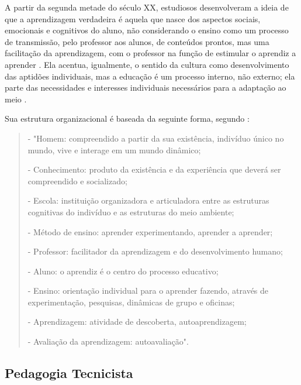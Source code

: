 A partir da segunda metade do século XX, estudiosos desenvolveram a ideia de que a aprendizagem verdadeira é aquela que nasce dos aspectos sociais, emocionais e cognitivos do aluno, não considerando o ensino como um processo de transmissão, pelo professor aos alunos, de conteúdos prontos, mas uma facilitação da aprendizagem, com o professor na função de estimular o aprendiz a aprender \cite{larchert}. Ela acentua, igualmente, o sentido da cultura como desenvolvimento das aptidões individuais, mas a educação é um processo interno, não externo; ela parte das necessidades e interesses individuais necessários para a adaptação ao meio \cite{libaneo}.

Sua estrutura organizacional é baseada da seguinte forma, segundo \cite{larchert}:
\begin{quote}- "Homem: compreendido a partir da sua existência, indivíduo único no mundo, vive e interage em um mundo dinâmico;

- Conhecimento: produto da existência e da experiência que deverá ser compreendido e socializado;

- Escola: instituição organizadora e articuladora entre as estruturas cognitivas do indivíduo e as estruturas do meio ambiente;

- Método de ensino: aprender experimentando, aprender a aprender;
	
- Professor: facilitador da aprendizagem e do desenvolvimento humano;

- Aluno: o aprendiz é o centro do processo educativo;

- Ensino: orientação individual para o aprender fazendo, através de experimentação, pesquisas, dinâmicas de grupo e oficinas;
	
- Aprendizagem: atividade de descoberta, autoaprendizagem;

- Avaliação da aprendizagem: autoavaliação".
\end{quote}

\subsection{Pedagogia Tecnicista}\label{sec:ped_tecni}

